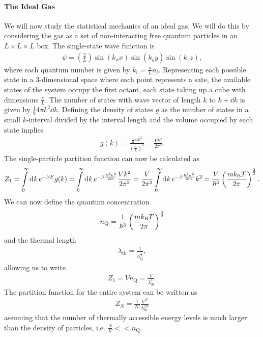 \paragraph{The Ideal Gas}
We will now study the statistical mechanics of an ideal gas. We will do this by considering the gas as a set of non-interacting free quantum particles in an $L\times L\times L$ box. The single-state wave function is
\begin{align*}
\psi = \left(\frac{2}{L}\right)\sin(k_{x}x)\sin(k_{y}y)\sin(k_{z}z),
\end{align*}
where each quantum number is given by $k_{i} = \frac{\pi}{L}n_{i}$. Representing each possible state in a $3$-dimensional space where each point represents a sate, the available states of the system occupy the first octant, each state taking up a cube with dimensions $\frac{\pi}{L}$. The number of states with wave vector of length $k$ to $k + \dd{k}$ is given by $\frac{1}{8}4\pi k^{2}\dd{k}$. Defining the density of states $g$ as the number of states in a small $k$-interval divided by the interval length and the volume occupied by each state implies 
\begin{align*}
g(k) = \frac{\frac{1}{2}\pi k^{2}}{\left(\frac{\pi}{L}\right)^{3}} = \frac{Vk^{2}}{2\pi^{2}}.
\end{align*}
The single-particle partition function can now be calculated as
\begin{align*}
Z_{1} = \int\limits_{0}^{\infty}\dd[]{k}e^{-\beta E}g(k) = \int\limits_{0}^{\infty}\dd[]{k}e^{-\beta\frac{\hbar^{2}k^{2}}{2m}}\frac{Vk^{2}}{2\pi^{2}} = \frac{V}{2\pi^{2}}\int\limits_{0}^{\infty}\dd[]{k}e^{-\beta\frac{\hbar^{2}k^{2}}{2m}}k^{2} = \frac{V}{\hbar^{3}}\left(\frac{mk_{\text{B}} T}{2\pi}\right)^{\frac{3}{2}}.
\end{align*}
We can now define the quantum concentration
\begin{align*}
n_{\text{Q}} = \frac{1}{\hbar^{3}}\left(\frac{mk_{\text{B}} T}{2\pi}\right)^{\frac{3}{2}}
\end{align*}
and the thermal length
\begin{align*}
\lambda_{\text{th}} = \frac{1}{n_{\text{Q}}^{\frac{1}{3}}},
\end{align*}
allowing us to write
\begin{align*}
Z_{1} = Vn_{\text{Q}} = \frac{V}{\lambda_{\text{th}}^{3}}.
\end{align*}
The partition function for the entire system can be written as
\begin{align*}
Z_{N} = \frac{1}{N!}\frac{V^{N}}{\lambda_{\text{th}}^{3N}}
\end{align*}
assuming that the number of thermally accessible energy levels is much larger than the density of particles, i.e. $\frac{N}{V} << n_{\text{Q}}$.


